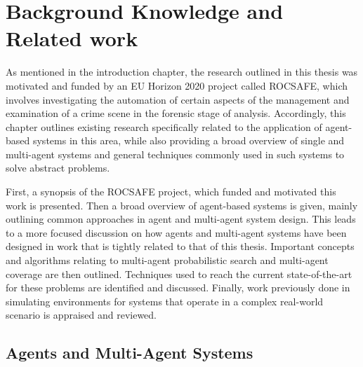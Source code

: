 

\chapter{Background Knowledge and Related work}\label{chapter:Background}

\workinprogress
As mentioned in the introduction chapter, the research outlined in this thesis was motivated and funded by an EU Horizon 2020 project called ROCSAFE, which involves investigating the automation of certain aspects of the management and examination of a crime scene in the forensic stage of analysis. Accordingly, this chapter outlines existing research specifically related to the application of agent-based systems in this area, while also providing a broad overview of single and multi-agent systems and general techniques commonly used in such systems to solve abstract problems. \par
First, a synopsis of the ROCSAFE project, which funded and motivated this work is presented. Then a broad overview of agent-based systems is given, mainly outlining common approaches in agent and multi-agent system design. This leads to a more focused discussion on how agents and multi-agent systems have been designed in work that is tightly related to that of this thesis. Important concepts and algorithms relating to multi-agent probabilistic search and multi-agent coverage are then outlined. Techniques used to reach the current state-of-the-art for these problems are identified and discussed. Finally, work previously done in simulating environments for systems that operate in a complex real-world scenario is appraised and reviewed.





\section{Agents and Multi-Agent Systems}



